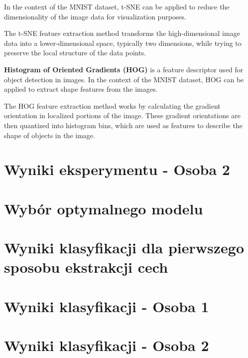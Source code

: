 \documentclass[12pt]{article}
\begin{document}
    In the context of the MNIST dataset, t-SNE can be applied to reduce the dimensionality of the image data for visualization purposes.

    The t-SNE feature extraction method transforms the high-dimensional image data into a lower-dimensional space, typically two dimensions, while trying to preserve the local structure of the data points.

    \textbf{Histogram of Oriented Gradients (HOG)} is a feature descriptor used for object detection in images. In the context of the MNIST dataset, HOG can be applied to extract shape features from the images.

    The HOG feature extraction method works by calculating the gradient orientation in localized portions of the image. These gradient orientations are then quantized into histogram bins, which are used as features to describe the shape of objects in the image.

    \pagebreak

    \section{Wyniki eksperymentu - Osoba 2}
    \pagebreak

    \section{Wybór optymalnego modelu}
    \pagebreak

    \section{Wyniki klasyfikacji dla pierwszego sposobu ekstrakcji cech}
    \pagebreak

    \section{Wyniki klasyfikacji - Osoba 1}
    \pagebreak

    \section{Wyniki klasyfikacji - Osoba 2}
    \pagebreak

    \section{}
    \pagebreak
\end{document}
